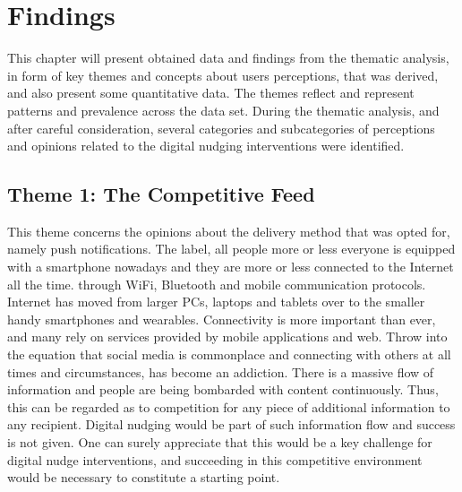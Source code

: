 \chapter{Findings}
This chapter will present obtained data and findings from the thematic analysis, in form of key themes and concepts about users perceptions, that was derived, and also present some quantitative data. The themes reflect and represent patterns and prevalence across the data set. During the thematic analysis, and after careful consideration, several categories and subcategories of perceptions and opinions related to the digital nudging interventions were identified. 

\section{Theme 1: The Competitive Feed}
This theme concerns the opinions about the delivery method that was opted for, namely push notifications. The label, all people more or less everyone is equipped with a smartphone nowadays and they are more or less connected to the Internet all the time. through WiFi, Bluetooth and mobile communication protocols. Internet has moved from larger PCs, laptops and tablets over to the smaller handy smartphones and wearables. Connectivity is more important than ever, and many rely on services provided by mobile applications and web. Throw into the equation that social media is commonplace and connecting with others at all times and circumstances, has become an addiction. There is a massive flow of information and people are being bombarded with content continuously. Thus, this can be regarded as to competition for any piece of additional information to any recipient. Digital nudging would be part of such information flow and success is not given. One can surely appreciate that this would be a key challenge for digital nudge interventions, and succeeding in this competitive environment would be necessary to constitute a starting point.

